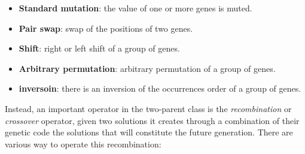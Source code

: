 \documentclass{article}
\begin{document}
\begin{itemize}
    \item \textbf{Standard mutation}: the value of one or more genes is muted.
    \item \textbf{Pair swap}: swap of the positions of two genes.
    \item \textbf{Shift}: right or left shift of a group of genes.
    \item \textbf{Arbitrary permutation}: arbitrary permutation of a group of genes.
    \item \textbf{inversoin}: there is an inversion of the occurrences order of a group of genes.
\end{itemize}
Instead, an important operator in the two-parent class is the \textit{recombination} or
\textit{crossover} operator, given two solutions it creates through a combination
of their genetic code the solutions that will constitute the future generation. There
are various way to operate this recombination:
\end{document}
